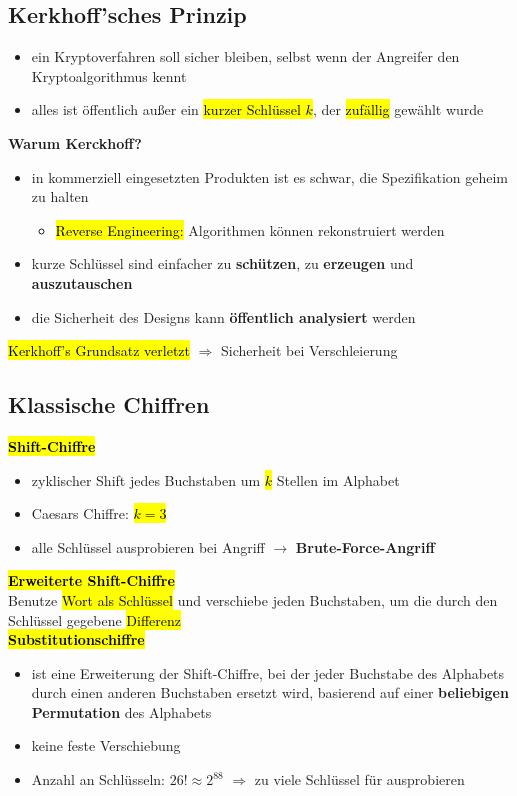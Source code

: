 \documentclass[a4paper, 10pt]{article}
\begin{document}
\subsection{Kerkhoff'sches Prinzip}
\begin{itemize}
    \item ein Kryptoverfahren soll sicher bleiben, selbst wenn der Angreifer den Kryptoalgorithmus kennt
    \item alles ist öffentlich außer ein \hl{kurzer Schlüssel $k$}, der \hl{zufällig} gewählt wurde
\end{itemize}
\textbf{Warum Kerckhoff?}
\begin{itemize}
    \item in kommerziell eingesetzten Produkten ist es schwar, die Spezifikation geheim zu halten
    \begin{itemize}
        \item \hl{Reverse Engineering:} Algorithmen können rekonstruiert werden 
    \end{itemize}

    \item kurze Schlüssel sind einfacher zu \textbf{schützen}, zu \textbf{erzeugen} und \textbf{auszutauschen}
    \item die Sicherheit des Designs kann \textbf{öffentlich analysiert} werden
\end{itemize}

\hl{Kerkhoff's Grundsatz verletzt} $\Longrightarrow$ Sicherheit bei Verschleierung
\subsection{Klassische Chiffren}
\textbf{\hl{Shift-Chiffre}}
\begin{itemize}
    \item zyklischer Shift jedes Buchstaben um \hl{$k$} Stellen im Alphabet
    \item Caesars Chiffre: \hl{$k=3$}
    \item alle Schlüssel ausprobieren bei Angriff $\longrightarrow$ \textbf{Brute-Force-Angriff}
\end{itemize}

\noindent\textbf{\hl{Erweiterte Shift-Chiffre}}\\[2.5mm]
Benutze \hl{Wort als Schlüssel} und verschiebe jeden Buchstaben, um die durch den Schlüssel gegebene \hl{Differenz}\\[3.5mm]
\textbf{\hl{Substitutionschiffre}}
\begin{itemize}
    \item ist eine Erweiterung der Shift-Chiffre, bei der jeder Buchstabe des Alphabets durch einen anderen Buchstaben ersetzt wird, basierend auf einer \textbf{beliebigen Permutation} des Alphabets
    \item keine feste Verschiebung
    \item Anzahl an Schlüsseln: $26! \approx 2^{88}$
    $\Longrightarrow$ zu viele Schlüssel für ausprobieren
\end{itemize}
\end{document}
